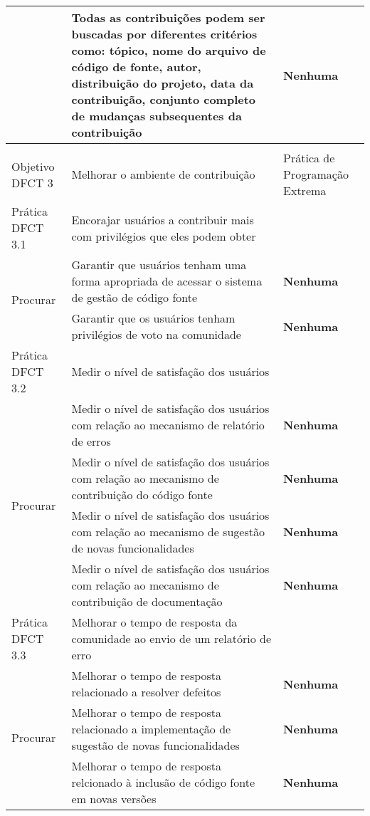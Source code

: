 \begin{longtable}{|p{2cm}|p{7cm}|p{7cm}|}
  \cline{2-3} & Todas as contribuições podem ser buscadas por
  diferentes critérios como: tópico, nome do arquivo de código de
  fonte, autor, distribuição do projeto, data da contribuição,
  conjunto completo de mudanças subsequentes da contribuição
  &\textbf{Nenhuma} \\
  \hline
  & & \\
  \hline \cellcolor[gray]{0.6} Objetivo DFCT 3 & \cellcolor[gray]{0.6}
  Melhorar o ambiente de contribuição & Prática de Programação Extrema \\
  \hline \cellcolor[gray]{0.9} Prática DFCT 3.1 &
  \cellcolor[gray]{0.9} Encorajar usuários a contribuir mais com
  privilégios que eles podem
  obter & \\
  \hline \multirow{2}{*}{Procurar} & Garantir que usuários tenham uma
  forma apropriada de acessar o sistema de gestão de código fonte &
  \textbf{Nenhuma} \\
  \cline{2-3} & Garantir que os usuários tenham privilégios de voto na
  comunidade & \textbf{Nenhuma} \\
  \hline \cellcolor[gray]{0.9} Prática DFCT 3.2 &
  \cellcolor[gray]{0.9}
  Medir o nível de satisfação dos usuários & \\
  \hline \multirow{4}{*}{Procurar} & Medir o nível de satisfação dos
  usuários com relação ao mecanismo de relatório de erros &
  \textbf{Nenhuma} \\
  \cline{2-3} & Medir o nível de satisfação dos usuários com relação
  ao mecanismo de contribuição do código fonte &\textbf{Nenhuma} \\
  \cline{2-3} & Medir o nível de satisfação dos usuários com relação
  ao mecanismo de sugestão de novas funcionalidades &\textbf{Nenhuma}
  \\
  \cline{2-3} & Medir o nível de satisfação dos usuários com relação
  ao mecanismo de contribuição de documentação &\textbf{Nenhuma} \\
  \hline \cellcolor[gray]{0.9} Prática DFCT 3.3 &
  \cellcolor[gray]{0.9} Melhorar o tempo de resposta da comunidade ao
  envio de um relatório
  de erro & \\
  \hline \multirow{3}{*}{Procurar} & Melhorar o tempo de resposta
  relacionado a resolver defeitos & \textbf{Nenhuma} \\
  \cline{2-3} & Melhorar o tempo de resposta relacionado a
  implementação de sugestão de novas funcionalidades &\textbf{Nenhuma} \\
  \cline{2-3} & Melhorar o tempo de resposta relcionado à inclusão de
  código fonte em novas versões &\textbf{Nenhuma} \\
  \hline
\end{longtable}

